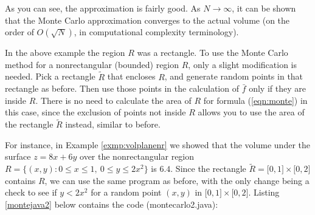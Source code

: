 As you can see, the approximation is fairly good.
As $N \to \infty$, it can be shown that the Monte Carlo approximation converges to the actual volume
(on the order of $O(\sqrt{N})$, in computational complexity terminology).

In the above example the region $R$ was a rectangle. To use the Monte Carlo method for a nonrectangular
(bounded) region $R$, only a slight modification is needed. Pick a rectangle $\tilde{R}$ that encloses $R$, and
generate
random points in that rectangle as before. Then use those points in the calculation of $\bar{f}$ only if they are inside
$R$. There is no need to calculate the area of $R$ for formula (\ref{eqn:monte}) in this case, since the exclusion of
points not inside $R$ allows you to use the area of the rectangle $\tilde{R}$ instead, similar to before.

For instance, in
Example \ref{exmp:volplanenr} we showed that the volume under the surface $z=8x+6y$ over the
nonrectangular region $R = \lbrace (x,y): 0 \le x \le 1,~ 0 \le y \le 2x^2 \rbrace$ is $6.4$. Since the rectangle
$\tilde{R} = \lbrack 0,1 \rbrack \times \lbrack 0,2 \rbrack$ contains $R$, we can use the same
program as before, with the only change being a check to see if $y < 2x^2$
for a random point $(x,y)$ in $\lbrack 0,1 \rbrack \times \lbrack 0,2 \rbrack$. Listing
\ref{montejava2} below contains the code (montecarlo2.java):


